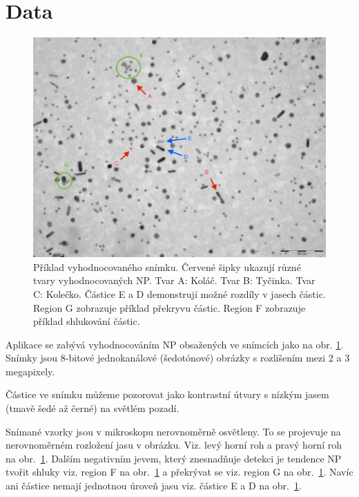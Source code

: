 \documentclass[11pt,twoside,a4paper,table]{book}
\begin{document}
\section{Data}

\begin{figure}
\centering
\includegraphics[scale=0.3]{figures/data1.jpg}
\caption[Příklad vyhodnocovaného snímku.]{Příklad vyhodnocovaného snímku. Červené šipky ukazují různé tvary vyhodnocovaných NP. Tvar A: Koláč. Tvar B: Tyčinka. Tvar C: Kolečko. Částice E a D demonstrují možné rozdíly v jasech částic. Region G zobrazuje příklad překryvu částic. Region F zobrazuje příklad shlukování částic.}
\label{fig:data_example}
\end{figure}

Aplikace se zabývá vyhodnocováním NP obsažených ve snímcích jako na obr. \ref{fig:data_example}. Snímky jsou 8-bitové jednokanálové (šedotónové) obrázky s rozlišením mezi 2 a 3 megapixely.

Částice ve snímku můžeme pozorovat jako kontrastní útvary s nízkým jasem (tmavě šedé až černé) na světlém pozadí.

Snímané vzorky jsou v mikroskopu nerovnoměrně osvětleny. To se projevuje na nerovnoměrném rozložení jasu v obrázku. Viz. levý horní roh a pravý horní roh na obr.~\ref{fig:data_example}. Dalším negativním jevem, který znesnadňuje detekci je tendence NP tvořit shluky viz. region F na obr.~\ref{fig:data_example} a překrývat se viz. region G na obr.~\ref{fig:data_example}. Navíc ani částice nemají jednotnou úroveň jasu viz. částice E a D na obr.~\ref{fig:data_example}.
\end{document}
